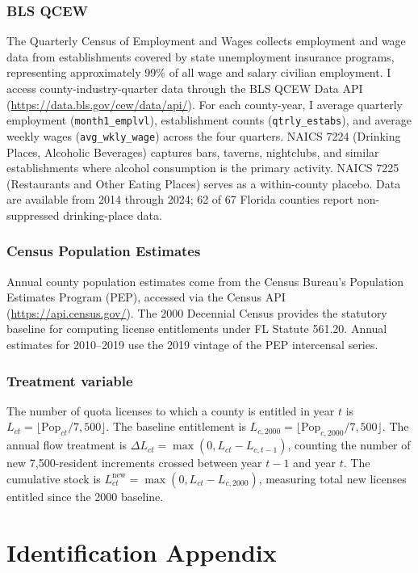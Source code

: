 \documentclass[12pt]{article}
\begin{document}
\subsubsection*{BLS QCEW} The Quarterly Census of Employment and Wages collects employment and wage data from establishments covered by state unemployment insurance programs, representing approximately 99\% of all wage and salary civilian employment. I access county-industry-quarter data through the BLS QCEW Data API (\url{https://data.bls.gov/cew/data/api/}). For each county-year, I average quarterly employment (\texttt{month1\_emplvl}), establishment counts (\texttt{qtrly\_estabs}), and average weekly wages (\texttt{avg\_wkly\_wage}) across the four quarters. NAICS 7224 (Drinking Places, Alcoholic Beverages) captures bars, taverns, nightclubs, and similar establishments where alcohol consumption is the primary activity. NAICS 7225 (Restaurants and Other Eating Places) serves as a within-county placebo. Data are available from 2014 through 2024; 62 of 67 Florida counties report non-suppressed drinking-place data.

\subsubsection*{Census Population Estimates} Annual county population estimates come from the Census Bureau's Population Estimates Program (PEP), accessed via the Census API (\url{https://api.census.gov/}). The 2000 Decennial Census provides the statutory baseline for computing license entitlements under FL Statute 561.20. Annual estimates for 2010--2019 use the 2019 vintage of the PEP intercensal series.

\subsubsection*{Treatment variable} The number of quota licenses to which a county is entitled in year $t$ is $L_{ct} = \lfloor \text{Pop}_{ct} / 7{,}500 \rfloor$. The baseline entitlement is $L_{c,2000} = \lfloor \text{Pop}_{c,2000} / 7{,}500 \rfloor$. The annual flow treatment is $\Delta L_{ct} = \max(0, L_{ct} - L_{c,t-1})$, counting the number of new 7,500-resident increments crossed between year $t-1$ and year $t$. The cumulative stock is $L_{ct}^{\text{new}} = \max(0, L_{ct} - L_{c,2000})$, measuring total new licenses entitled since the 2000 baseline.

\section{Identification Appendix}
\end{document}
